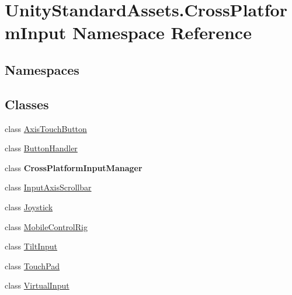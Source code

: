\hypertarget{namespace_unity_standard_assets_1_1_cross_platform_input}{}\section{Unity\+Standard\+Assets.\+Cross\+Platform\+Input Namespace Reference}
\label{namespace_unity_standard_assets_1_1_cross_platform_input}
\subsection*{Namespaces}
\begin{DoxyCompactItemize}
\end{DoxyCompactItemize}
\subsection*{Classes}
\begin{DoxyCompactItemize}
\item 
class \hyperlink{class_unity_standard_assets_1_1_cross_platform_input_1_1_axis_touch_button}{Axis\+Touch\+Button}
\item 
class \hyperlink{class_unity_standard_assets_1_1_cross_platform_input_1_1_button_handler}{Button\+Handler}
\item 
class {\bfseries Cross\+Platform\+Input\+Manager}
\item 
class \hyperlink{class_unity_standard_assets_1_1_cross_platform_input_1_1_input_axis_scrollbar}{Input\+Axis\+Scrollbar}
\item 
class \hyperlink{class_unity_standard_assets_1_1_cross_platform_input_1_1_joystick}{Joystick}
\item 
class \hyperlink{class_unity_standard_assets_1_1_cross_platform_input_1_1_mobile_control_rig}{Mobile\+Control\+Rig}
\item 
class \hyperlink{class_unity_standard_assets_1_1_cross_platform_input_1_1_tilt_input}{Tilt\+Input}
\item 
class \hyperlink{class_unity_standard_assets_1_1_cross_platform_input_1_1_touch_pad}{Touch\+Pad}
\item 
class \hyperlink{class_unity_standard_assets_1_1_cross_platform_input_1_1_virtual_input}{Virtual\+Input}
\end{DoxyCompactItemize}
